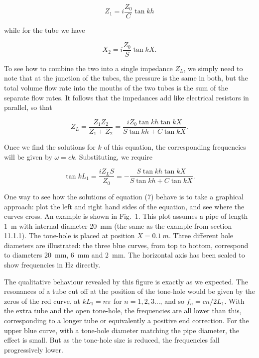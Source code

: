   \begin{equation*}Z_1=i\dfrac{Z_0}{C} \tan kh \tag{4}\end{equation*} 

  \noindent{}while for the tube we have 

  \begin{equation*}X_2=i\dfrac{Z_0}{S} \tan kX . \tag{5}\end{equation*} 

  To see how to combine the two into a single impedance $Z_L$, we simply need 
  to note that at the junction of the tubes, the pressure is the same in both, 
  but the total volume flow rate into the mouths of the two tubes is the sum of 
  the separate flow rates. It follows that the impedances add like electrical 
  resistors in parallel, so that 

  \begin{equation*}Z_L=\dfrac{Z_1 Z_2}{Z_1 + Z_2} = \dfrac{i Z_0 \tan kh \tan 
  kX}{S \tan kh + C \tan kX} . \tag{6}\end{equation*} 

  Once we find the solutions for $k$ of this equation, the corresponding 
  frequencies will be given by $\omega=ck$. Substituting, we require 

  \begin{equation*}\tan kL_1 = \dfrac{iZ_L S}{Z_0} = -\dfrac{S\tan kh \tan 
  kX}{S \tan kh + C \tan kX} . \tag{7}\end{equation*} 

  One way to see how the solutions of equation (7) behave is to take a 
  graphical approach: plot the left and right hand sides of the equation, and 
  see where the curves cross. An example is shown in Fig.\ 1. This plot assumes 
  a pipe of length 1~m with internal diameter 20~mm (the same as the example 
  from section 11.1.1). The tone-hole is placed at position $X=0.1\mathrm~m$. 
  Three different hole diameters are illustrated: the three blue curves, from 
  top to bottom, correspond to diameters 20~mm, 6~mm and 2~mm. The horizontal 
  axis has been scaled to show frequencies in Hz directly. 


  The qualitative behaviour revealed by this figure is exactly as we expected. 
  The resonances of a tube cut off at the position of the tone-hole would be 
  given by the zeros of the red curve, at $kL_1=n \pi$ for $n=1,2,3...$, and so 
  $f_n=cn/2L_1$. With the extra tube and the open tone-hole, the frequencies 
  are all lower than this, corresponding to a longer tube or equivalently a 
  positive end correction. For the upper blue curve, with a tone-hole diameter 
  matching the pipe diameter, the effect is small. But as the tone-hole size is 
  reduced, the frequencies fall progressively lower. 

